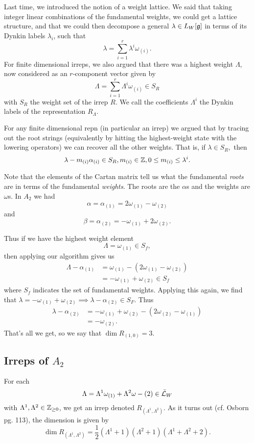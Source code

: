 Last time, we introduced the notion of a weight lattice. We said that taking integer linear combinations of the fundamental weights, we could get a lattice structure, and that we could then decompose a general $\lambda \in L_W[\mathfrak{g}]$ in terms of its Dynkin labels $\lambda_i$, such that
$$\lambda=\sum_{i=1}^r \lambda^i \omega_{(i)}.$$
For finite dimensional irreps, we also argued that there was a highest weight $\Lambda$, now considered as an $r$-component vector given by
$$\Lambda=\sum_{i=1}^r \Lambda^i \omega_{(i)}\in S_R$$
with $S_R$ the weight set of the irrep $R$. We call the coefficients $\Lambda^i$ the Dynkin labels of the representation $R_\Lambda$.

For any finite dimensional repn (in particular an irrep) we argued that by tracing out the root strings (equivalently by hitting the highest-weight state with the lowering operators) we can recover all the other weights. That is, if $\lambda \in S_R,$ then
$$\lambda-m_{(i)} \alpha_{(i)} \in S_R, m_{(i)}\in \mathbb{Z}, 0\leq m_{(i)}\leq \lambda^i.$$

Note that the elements of the Cartan matrix tell us what the fundamental \emph{roots} are in terms of the fundamental \emph{weights}. The roots are the $\alpha$s and the weights are $\omega$s. In $A_2$ we had
 $$\alpha=\alpha_{(1)}=2\omega_{(1)}-\omega_{(2)}$$
and $$\beta=\alpha_{(2)}=-\omega_{(1)}+2\omega_{(2)}.$$

Thus if we have the highest weight element 
$$\Lambda=\omega_{(1)}\in S_f,$$ then applying our algorithm gives us
\begin{align*}
    \Lambda-\alpha_{(1)}&=\omega_{(1)}-(2\omega_{(1)}-\omega_{(2)})\\
    &=-\omega_{(1)}+\omega_{(2)} \in S_f
\end{align*}
where $S_f$ indicates the set of fundamental weights.
Applying this again, we find that
$\lambda=-\omega_{(1)}+\omega_{(2)}\implies \lambda-\alpha_{(2)} \in S_F.$ Thus
\begin{align*}
    \lambda-\alpha_{(2)}&=-\omega_{(1)}+\omega_{(2)}-(2\omega_{(2)}-\omega_{(1)})\\
    &=-\omega_{(2)}.
\end{align*}
That's all we get, so we say that $\dim R_{(1,0)}=3$.

\subsection*{Irreps of $A_2$} For each 
$$\Lambda=\Lambda^1 \omega_{(1)}+\Lambda^2 \omega-{(2)} \in \bar {\mathcal L}_W$$
with $\Lambda^1,\Lambda^2 \in \mathbb{Z}_{\geq 0}$, we get an irrep denoted $R_{(\Lambda^1,\Lambda^2)}$. As it turns out (cf. Osborn pg. 113), the dimension is given by
$$\dim R_{(\Lambda^1,\Lambda^2)}=\frac{1}{2}(\Lambda^1+1)(\Lambda^2+1)(\Lambda^1+\Lambda^2+2).$$

